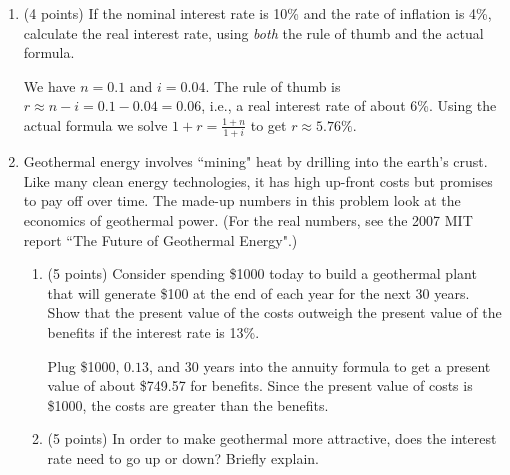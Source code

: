 \documentclass[twoside]{article}
\begin{document}
\begin{enumerate}
\begin{enumerate}
    \end{enumerate}






\item \begin{EXAM}(4 points) If the nominal interest rate is 10\% and the rate of inflation is 4\%, calculate the real interest rate, using \emph{both} the rule of thumb and the actual formula. \end{EXAM}

\begin{KEY}
We have $n=0.1$ and $i=0.04$. The rule of thumb is $r\approx n-i =0.1-0.04=0.06$, i.e., a real interest rate of about 6\%. Using the actual formula we solve $1+r=\frac{1+n}{1+i}$ to get $r\approx 5.76\%$.
\end{KEY}





\item \begin{EXAM} Geothermal energy involves ``mining" heat by drilling into the earth's crust. Like many clean energy technologies, it has high up-front costs but promises to pay off over time. The made-up numbers in this problem look at the economics of geothermal power. (For the real numbers, see the 2007 MIT report ``The Future of Geothermal Energy".) \end{EXAM}

    \begin{enumerate}

    \item \begin{EXAM} (5 points) Consider spending \$1000 today to build a geothermal plant that will generate \$100 at the end of each year for the next 30 years. Show that the present value of the costs outweigh the present value of the benefits if the interest rate is 13\%.  \end{EXAM}

\begin{KEY}
Plug \$1000, $0.13$, and 30 years into the annuity formula to get a present value of about \$749.57 for benefits. Since the present value of costs is \$1000, the costs are greater than the benefits.
\end{KEY}


    \item \begin{EXAM} (5 points) In order to make geothermal more attractive, does the interest rate need to go up or down? Briefly explain.   \end{EXAM}


\end{enumerate}
\end{enumerate}
\end{document}
